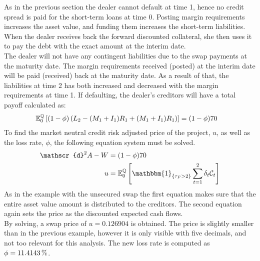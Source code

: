 \documentclass[main.tex]{subfiles}
\begin{document}
            As in the previous section the dealer cannot default at time 1,
            hence no credit spread is paid for the short-term loans at time 0.
            Posting margin requirements increases the asset value,
            and funding them increases the short-term liabilities.
            When the dealer receives back the forward discounted collateral,
            she then uses it to pay the debt with the exact amount at the interim date.
            \\
            The dealer will not have any contingent liabilities due to the swap payments at the maturity date.
            The margin requirements received (posted) at the interim date will be paid (received) back at the maturity date.
            As a result of that,
            the liabilities at time 2 has both increased and decreased with the margin requirements at time 1.
            If defaulting, the dealer's creditors will have a total payoff calculated as:
            \begin{align}
                \mathbb{E}_{0}^{\mathbb{Q}}\left[
                    (1-\phi)\left(
                        L_{2}
                        -(M_1+I_1)R_{1}
                        +(M_1+I_1)R_{1}
                    \right)
                \right] 
                &= (1-\phi)\num{70}
            \end{align}
            To find the market neutral credit risk adjusted price of the project, $u$, as well as the loss rate, $\phi$,
            the following equation system must be solved.
            \begin{align}
                \mathscr{d}^{2} A - W
                &=
                (1-\phi)\num{70}
                \\
                u &=
                \mathbb{E}_{0}^{\rnmeasure}\left[
                    \mathbbm{1}_{\{\tau_{F}>2\}} 
                    \sum_{t=1}^{2}
                    \delta_{t}\mathcal{C}_{t}
                \right]
            \end{align}
            As in the example with the unsecured swap the first equation makes sure
            that the entire asset value amount is distributed to the creditors.
            The second equation again sets the price as the discounted expected cash flows.
            \\
            By solving, a swap price of $u=\num{0.126904}$ is obtained.
            The price is slightly smaller than in the previous example,
            however it is only visible with five decimals,
            and not too relevant for this analysis.
            The new loss rate is computed as $\phi = \pct{0.114143}$.
\end{document}
